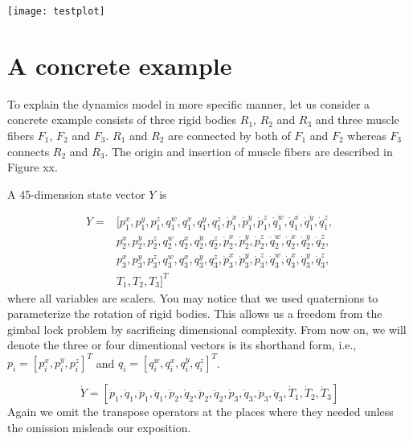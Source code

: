 \documentclass[a4paper,10pt]{article}
\begin{document}
\texttt{[image: testplot]}

\section{A concrete example}

To explain the dynamics model in more specific manner, let us consider
a concrete example consists of three rigid bodies $R_1$, $R_2$ and $R_3$
and three muscle fibers $F_1$, $F_2$ and $F_3$. $R_1$ and $R_2$ are connected
by both of $F_1$ and $F_2$ whereas $F_3$ connects $R_2$ and $R_3$. The
origin and insertion of muscle fibers are described in Figure xx.

A 45-dimension state vector $Y$ is

\begin{align*}
Y = {} & [p_1^x, p_1^y, p_1^z, q_1^w, q_1^x, q_1^y, q_1^z, \dot{p}_1^x, \dot{p}_1^y, \dot{p}_1^z, \dot{q}_1^w, \dot{q}_1^x, \dot{q}_1^y, \dot{q}_1^z,\\
       &  p_2^x, p_2^y, p_2^z, q_2^w, q_2^x, q_2^y, q_2^z, \dot{p}_2^x, \dot{p}_2^y, \dot{p}_2^z, \dot{q}_2^w, \dot{q}_2^x, \dot{q}_2^y, \dot{q}_2^z,\\
       &  p_3^x, p_3^y, p_3^z, q_3^w, q_3^x, q_3^y, q_3^z, \dot{p}_3^x, \dot{p}_3^y, \dot{p}_3^z, \dot{q}_3^w, \dot{q}_3^x, \dot{q}_3^y, \dot{q}_3^z,\\
       & T_1, T_2, T_3]^T
\end{align*}
where all variables are scalers. You may notice that we used quaternions
to parameterize the rotation of rigid bodies. This allows us a freedom
from the gimbal lock problem by sacrificing dimensional complexity. From
now on, we will denote the three or four dimentional vectors is its shorthand
form, i.e., $p_i=[p_i^x, p_i^y, p_i^z]^T$ and $q_i=[q_i^w, q_i^x, q_i^y, q_i^z]^T$.

\begin{equation}
\dot{Y}  =  [\dot{p}_1, \dot{q}_1, \ddot{p}_1, \ddot{q}_1,
               \dot{p}_2, \dot{q}_2, \ddot{p}_2, \ddot{q}_2,
               \dot{p}_3, \dot{q}_3, \ddot{p}_3, \ddot{q}_3,
               \dot{T}_1, \dot{T}_2, \dot{T}_3]
\end{equation}
Again we omit the transpose operators at the places where they needed
unless the omission misleads our exposition.
\end{document}
